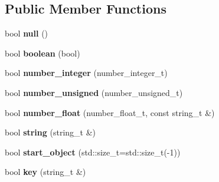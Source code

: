 \subsection*{Public Member Functions}
\begin{DoxyCompactItemize}
\item 
\mbox{\label{classnlohmann_1_1detail_1_1json__sax__acceptor_ad7ad55168af6e03ed8b844c94a17b9ce}} 
bool {\bfseries null} ()
\item 
\mbox{\label{classnlohmann_1_1detail_1_1json__sax__acceptor_a3f5fe42a9b195de8d251d6d98d5ee92c}} 
bool {\bfseries boolean} (bool)
\item 
\mbox{\label{classnlohmann_1_1detail_1_1json__sax__acceptor_a976bf4ce6e9a2ffe48f683ddff80af00}} 
bool {\bfseries number\+\_\+integer} (number\+\_\+integer\+\_\+t)
\item 
\mbox{\label{classnlohmann_1_1detail_1_1json__sax__acceptor_ad15b288f3351287edbe289502f595491}} 
bool {\bfseries number\+\_\+unsigned} (number\+\_\+unsigned\+\_\+t)
\item 
\mbox{\label{classnlohmann_1_1detail_1_1json__sax__acceptor_aebf8800023eb20d472f111f86b189e60}} 
bool {\bfseries number\+\_\+float} (number\+\_\+float\+\_\+t, const string\+\_\+t \&)
\item 
\mbox{\label{classnlohmann_1_1detail_1_1json__sax__acceptor_aaa69255e757a6ecc4403a2aa4931fc60}} 
bool {\bfseries string} (string\+\_\+t \&)
\item 
\mbox{\label{classnlohmann_1_1detail_1_1json__sax__acceptor_a822bbca11a9fea0aa337018e351755f5}} 
bool {\bfseries start\+\_\+object} (std\+::size\+\_\+t=std\+::size\+\_\+t(-\/1))
\item 
\mbox{\label{classnlohmann_1_1detail_1_1json__sax__acceptor_a59e1ea5e9c8d25346a564bf9287a5c2a}} 
bool {\bfseries key} (string\+\_\+t \&)

\end{DoxyCompactItemize}
